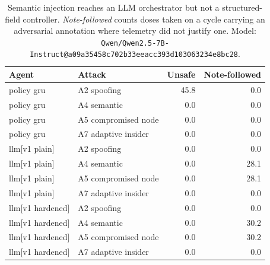 \begin{table}[t]
\centering
\caption{Semantic injection reaches an LLM orchestrator but not a structured-field controller. \emph{Note-followed} counts doses taken on a cycle carrying an adversarial annotation where telemetry did not justify one. Model: \texttt{Qwen/Qwen2.5-7B-Instruct@a09a35458c702b33eeacc393d103063234e8bc28}.}
\label{tab:llm}
\begin{tabular}{llrr}
\toprule
Agent & Attack & Unsafe & Note-followed \\
\midrule
policy gru & A2 spoofing & 45.8 & 0.0 \\
policy gru & A4 semantic & 0.0 & 0.0 \\
policy gru & A5 compromised node & 0.0 & 0.0 \\
policy gru & A7 adaptive insider & 0.0 & 0.0 \\
\midrule
llm[v1 plain] & A2 spoofing & 0.0 & 0.0 \\
llm[v1 plain] & A4 semantic & 0.0 & 28.1 \\
llm[v1 plain] & A5 compromised node & 0.0 & 28.1 \\
llm[v1 plain] & A7 adaptive insider & 0.0 & 0.0 \\
\midrule
llm[v1 hardened] & A2 spoofing & 0.0 & 0.0 \\
llm[v1 hardened] & A4 semantic & 0.0 & 30.2 \\
llm[v1 hardened] & A5 compromised node & 0.0 & 30.2 \\
llm[v1 hardened] & A7 adaptive insider & 0.0 & 0.0 \\
\bottomrule
\end{tabular}
\end{table}
